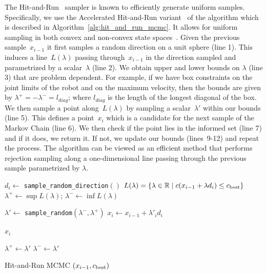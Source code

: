 \documentclass[letterpaper, 10 pt, conference]{ieeeconf}  %
\begin{document}
The Hit-and-Run~\cite{S84} sampler is known to efficiently generate uniform samples. 
Specifically, we use the Accelerated Hit-and-Run variant~\cite{KSZ11} of the algorithm which is described in Algorithm~\ref{alg:hit_and_run_mcmc}. It allows for uniform sampling in both convex and non-convex state spaces~\cite{KSZ11}.
Given the previous sample~$x_{i-1}$ it first  samples a random direction on a unit sphere (line 1).
This induces a line~$L(\lambda)$ passing through~$x_{i-1}$ in the direction sampled and parametrized by a scalar~$\lambda$ (line 2).
We obtain upper and lower bounds on $\lambda$ (line 3) that are problem dependent. 
For example, if we have box constraints on the joint limits of the robot and on the maximum velocity, then the bounds are given by $\lambda^{+} = -\lambda^{-} = l_{diag}$; where $l_{diag}$ is the length of the longest diagonal of the box.
We then sample a point along~$L(\lambda)$ by sampling a scalar~$\lambda'$ within our bounds (line 5).
This defines a point~$x_{i}$ which is a candidate for the next sample of the Markov Chain (line 6).
We then check if the point lies in the informed set (line 7) and if it does, we return it.
If not, we update our bounds (lines~9-12) and repeat the process.
The algorithm can be viewed as an efficient method that performs rejection sampling along a one-dimensional line passing through the previous sample parametrized by $\lambda$.

\begin{algorithm}[t]
	\begin{algorithmic}[1]
		\STATE $d_i \leftarrow$ \texttt{sample\_random\_direction}$()$
		\STATE $ L(\lambda) = \{  \lambda \in \mathbb{R} \mid c(x_{i-1} + \lambda d_i ) \leq c_{\rm best} \} $
		\STATE $ \lambda^{+} \leftarrow \sup L(\lambda) $; 
		\hspace{3mm} 
		$ \lambda^{-} \leftarrow \inf L(\lambda) $
		
		\LOOP
		
		\STATE $ \lambda' \leftarrow$ \texttt{sample\_random}$ (\lambda^{-} , \lambda^{+})$
		\STATE $ x_{i} \leftarrow x_{i-1} + \lambda'_{i} d_i $
		
		\RETURN $ x_{i}$
		\ENDIF
		
		\STATE $ \lambda^{+} \leftarrow \lambda' $
		\ELSE
		\STATE $ \lambda^{-} \leftarrow \lambda'$
		\ENDIF
		
		\ENDLOOP
	\end{algorithmic}
	\caption{\captionstyle Hit-and-Run MCMC $(x_{i-1}, c_{\rm best})$}
	\label{alg:hit_and_run_mcmc}	
\end{algorithm}
\end{document}

